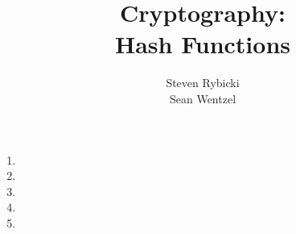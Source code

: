 \documentclass[12pt,a4paper]{article}
\title{{\bf Cryptography:}\\
Hash Functions}
\author{Steven Rybicki\\
Sean Wentzel}
\begin{document}
\maketitle
\begin{enumerate}
\item 
\item 
\item 
\item 
\item 
\end{enumerate}

\end{document}

